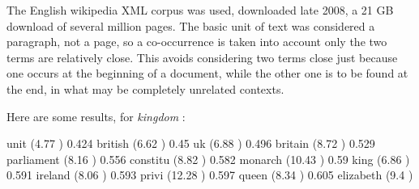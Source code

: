 \documentclass[a4paper,10pt]{article}
\begin{document}
The English wikipedia XML corpus was used, downloaded late 2008, a 21 GB download of several million pages. The basic
unit of text was considered a paragraph, not a page, so a co-occurrence is taken into account only the two terms are
relatively close. This avoids considering two terms close just because one occurs at the beginning of a document, while
the other one is to be found at the end, in what may be completely unrelated contexts.

Here are some results, for \textit{kingdom} : 

unit (4.77 )	0.424
british (6.62 )	0.45
uk (6.88 )	0.496
britain (8.72 )	0.529
parliament (8.16 )	0.556
constitu (8.82 )	0.582
monarch (10.43 )	0.59
king (6.86 )	0.591
ireland (8.06 )	0.593
privi (12.28 )	0.597
queen (8.34 )	0.605
elizabeth (9.4 )
\end{document}
